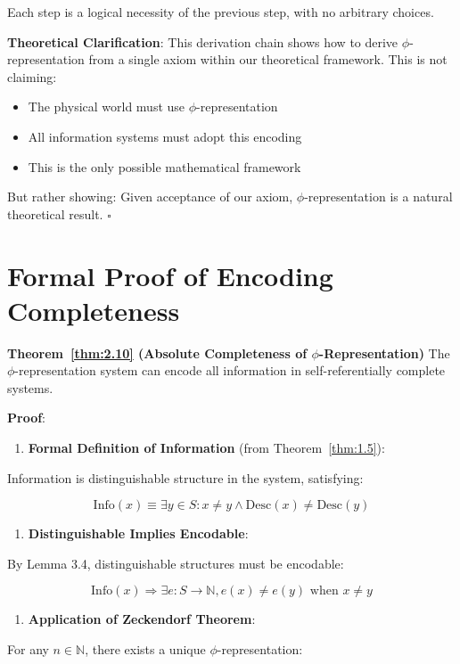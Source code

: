 Each step is a logical necessity of the previous step, with no arbitrary choices.

\textbf{Theoretical Clarification}: This derivation chain shows how to derive $\phi$-representation from a single axiom within our theoretical framework. This is not claiming:
\begin{itemize}
\item The physical world must use $\phi$-representation
\item All information systems must adopt this encoding
\item This is the only possible mathematical framework
\end{itemize}

But rather showing: Given acceptance of our axiom, $\phi$-representation is a natural theoretical result. $\square$

\section{Formal Proof of Encoding Completeness}
\label{sec:ch04_encoding:formal-proof-of-encoding-completeness}

\textbf{Theorem~\ref{thm:2.10} (Absolute Completeness of $\phi$-Representation)}
\label{thm:2.10}
The $\phi$-representation system can encode all information in self-referentially complete systems.

\textbf{Proof}:

\begin{enumerate}
\item \textbf{Formal Definition of Information} (from Theorem~\ref{thm:1.5}):
\end{enumerate}
   Information is distinguishable structure in the system, satisfying:
   
\begin{equation}
\text{Info}(x) \equiv \exists y \in S: x \neq y \land \text{Desc}(x) \neq \text{Desc}(y)
\end{equation}
\begin{enumerate}
\item \textbf{Distinguishable Implies Encodable}:
\end{enumerate}
   By Lemma 3.4, distinguishable structures must be encodable:
   
\begin{equation}
\text{Info}(x) \Rightarrow \exists e: S \to \mathbb{N}, e(x) \neq e(y) \text{ when } x \neq y
\end{equation}
\begin{enumerate}
\item \textbf{Application of Zeckendorf Theorem}:
\end{enumerate}
   For any $n \in \mathbb{N}$, there exists a unique $\phi$-representation:
   
